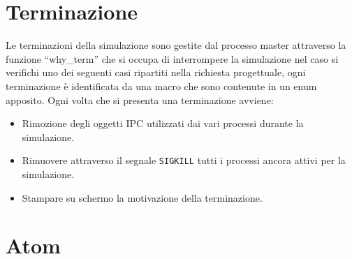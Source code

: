 \section{Terminazione} 
Le terminazioni della simulazione sono gestite dal processo master attraverso la funzione \enquote{why\_term} che si occupa di interrompere la simulazione nel caso si verifichi uno dei seguenti casi  ripartiti nella richiesta progettuale, ogni terminazione è identificata da una macro che sono contenute in un enum apposito. 
Ogni volta che si presenta una terminazione avviene:
\begin{itemize}
    \item Rimozione degli oggetti IPC utilizzati dai vari processi durante la simulazione. 
    \item Rimuovere attraverso il segnale \texttt{SIGKILL} tutti i processi ancora attivi per la simulazione. 
    \item Stampare su schermo la motivazione della terminazione. 
\end{itemize}
\section{Atom}

